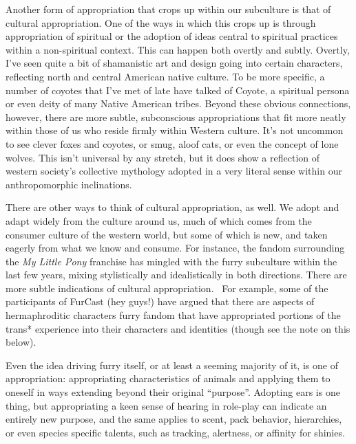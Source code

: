 Another form of appropriation that crops up within our subculture is
that of cultural appropriation. One of the ways in which this crops up
is through appropriation of spiritual or the adoption of ideas central
to spiritual practices within a non-spiritual context. This can happen
both overtly and subtly. Overtly, I've seen quite a bit of shamanistic
art and design going into certain characters, reflecting north and
central American native culture. To be more specific, a number of
coyotes that I've met of late have talked of Coyote, a spiritual persona
or even deity of many Native American tribes. Beyond these obvious
connections, however, there are more subtle, subconscious appropriations
that fit more neatly within those of us who reside firmly within Western
culture. It's not uncommon to see clever foxes and coyotes, or smug,
aloof cats, or even the concept of lone wolves. This isn't universal by
any stretch, but it does show a reflection of western society's
collective mythology adopted in a very literal sense within our
anthropomorphic inclinations.

There are other ways to think of cultural appropriation, as well. We
adopt and adapt widely from the culture around us, much of which comes
from the consumer culture of the western world, but some of which is
new, and taken eagerly from what we know and consume. For instance, the
fandom surrounding the \emph{My Little Pony} franchise has mingled with
the furry subculture within the last few years, mixing stylistically and
idealistically in both directions. There are more subtle indications of
cultural appropriation. ~For example, some of the participants of
FurCast (hey guys!) have argued that there are aspects of hermaphroditic
characters furry fandom that have appropriated portions of the trans*
experience into their characters and identities (though see the note on
this below).

Even the idea driving furry itself, or at least a seeming majority of
it, is one of appropriation: appropriating characteristics of animals
and applying them to oneself in ways extending beyond their original
``purpose''. Adopting ears is one thing, but appropriating a keen sense
of hearing in role-play can indicate an entirely new purpose, and the
same applies to scent, pack behavior, hierarchies, or even species
specific talents, such as tracking, alertness, or affinity for shinies.

